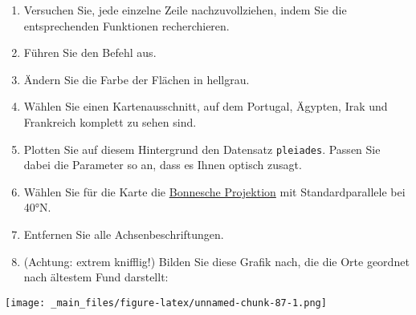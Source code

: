 \documentclass[11pt,german,a4paper]{article}
\begin{document}
\begin{enumerate}
\def\labelenumi{\arabic{enumi}.}
\setcounter{enumi}{8}
\item
  Versuchen Sie, jede einzelne Zeile nachzuvollziehen, indem Sie die entsprechenden Funktionen recherchieren.
\item
  Führen Sie den Befehl aus.
\item
  Ändern Sie die Farbe der Flächen in hellgrau.
\item
  Wählen Sie einen Kartenausschnitt, auf dem Portugal, Ägypten, Irak und Frankreich komplett zu sehen sind.
\item
  Plotten Sie auf diesem Hintergrund den Datensatz \texttt{pleiades}. Passen Sie dabei die Parameter so an, dass es Ihnen optisch zusagt.
\item
  Wählen Sie für die Karte die \href{https://de.wikipedia.org/wiki/Bonnesche_Projektion}{Bonnesche Projektion} mit Standardparallele bei 40°N.
\item
  Entfernen Sie alle Achsenbeschriftungen.
\item
  (Achtung: extrem knifflig!) Bilden Sie diese Grafik nach, die die Orte geordnet nach ältestem Fund darstellt:
\end{enumerate}

\texttt{[image: \_main\_files/figure-latex/unnamed-chunk-87-1.png]}
\end{document}
